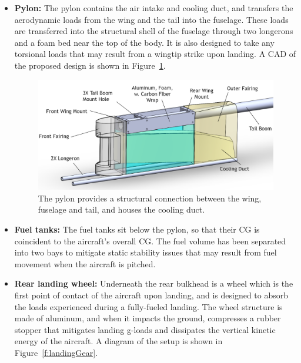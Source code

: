 \documentclass[journal]{aiaa-tc}%
\begin{document}
\begin{itemize}
\begin{itemize}
    \item \textbf{Pylon: } 
    The pylon contains the air intake and cooling duct, and transfers the aerodynamic loads from the wing and the tail into the fuselage. These loads are transferred into the structural shell of the fuselage through two longerons and a foam bed near the top of the body. It is also designed to take any torsional loads that may result from a wingtip strike upon landing. A CAD of the proposed design is shown in Figure~\ref{f:pylon}.
    
    \begin{figure}
    	\centering
    	\includegraphics{pylon.PNG}
    	\caption{The pylon provides a structural connection between the wing, fuselage and tail, and houses the cooling duct.}
    	\label{f:pylon}
    \end{figure} 
    
    \item \textbf{Fuel tanks: } 
    The fuel tanks sit below the pylon, so that their CG  is coincident to the aircraft's overall CG. The fuel volume has been separated into two bays to mitigate static stability issues that may result from fuel movement when the aircraft is pitched. 
    
    \item \textbf{Rear landing wheel:} 
    Underneath the rear bulkhead is a wheel which is the first point of contact of the aircraft upon landing, and is designed to absorb the loads experienced during a fully-fueled landing. The wheel structure is made of aluminum, and when it impacts the ground, compresses a rubber stopper that mitigates landing g-loads and dissipates the vertical kinetic energy of the aircraft. A diagram of the setup is shown in Figure~\ref{f:landingGear}.
    

\end{itemize}
\end{itemize}
\end{document}
